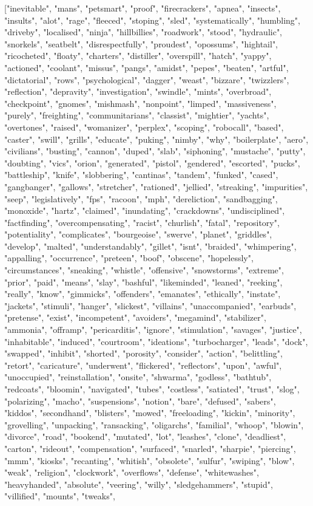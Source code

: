 ["inevitable", "mans", "petsmart", "proof", "firecrackers", "apnea", "insects", "insults", "alot", "rage", "fleeced", "stoping", "sled", "systematically", "humbling", "driveby", "localised", "ninja", "hillbillies", "roadwork", "stood", "hydraulic", "snorkels", "seatbelt", "disrespectfully", "proudest", "opossums", "hightail", "ricocheted", "floaty", "charters", "distiller", "overspill", "hatch", "yappy", "actioned", "coolant", "missus", "pangs", "amidst", "pepes", "beaten", "artful", "dictatorial", "rows", "psychological", "dagger", "weast", "bizzare", "twizzlers", "reflection", "depravity", "investigation", "swindle", "mints", "overbroad", "checkpoint", "gnomes", "mishmash", "nonpoint", "limped", "massiveness", "purely", "freighting", "communitarians", "classist", "mightier", "yachts", "overtones", "raised", "womanizer", "perplex", "scoping", "robocall", "based", "caster", "swill", "grills", "educate", "puking", "nimby", "why", "boilerplate", "aero", "civilians", "busting", "cannon", "duped", "slab", "siphoning", "mustache", "putty", "doubting", "vics", "orion", "generated", "pistol", "gendered", "escorted", "pucks", "battleship", "knife", "slobbering", "cantinas", "tandem", "funked", "cased", "gangbanger", "gallows", "stretcher", "rationed", "jellied", "streaking", "impurities", "seep", "legislatively", "fps", "racoon", "mph", "dereliction", "sandbagging", "monoxide", "hartz", "claimed", "inundating", "crackdowns", "undisciplined", "factfinding", "overcompensating", "racist", "churlish", "fatal", "repository", "potentiality", "complicates", "bourgeoise", "swerve", "planet", "griddles", "develop", "malted", "understandably", "gillet", "isnt", "braided", "whimpering", "appalling", "occurrence", "preteen", "boof", "obscene", "hopelessly", "circumstances", "sneaking", "whistle", "offensive", "snowstorms", "extreme", "prior", "paid", "means", "slay", "bashful", "likeminded", "leaned", "reeking", "really", "know", "gimmicks", "offenders", "emanates", "ethically", "instate", "jackets", "stimuli", "hanger", "slickest", "villains", "unaccompanied", "earbuds", "pretense", "exist", "incompetent", "avoiders", "megamind", "stabilizer", "ammonia", "offramp", "pericarditis", "ignore", "stimulation", "savages", "justice", "inhabitable", "induced", "courtroom", "ideations", "turbocharger", "leads", "dock", "swapped", "inhibit", "shorted", "porosity", "consider", "action", "belittling", "retort", "caricature", "underwent", "flickered", "reflectors", "upon", "awful", "unoccupied", "reinstallation", "onsite", "shwarma", "godless", "bathtub", "redcoats", "bloomin", "navigated", "tubes", "costless", "satiated", "trust", "slog", "polarizing", "macho", "suspensions", "notion", "bare", "defused", "sabers", "kiddos", "secondhand", "blisters", "mowed", "freeloading", "kickin", "minority", "grovelling", "unpacking", "ransacking", "oligarchs", "familial", "whoop", "blowin", "divorce", "road", "bookend", "mutated", "lot", "leashes", "clone", "deadliest", "carton", "rideout", "compensation", "surfaced", "snarled", "sharpie", "piercing", "mmm", "kiosks", "recanting", "whitish", "obsolete", "sulfur", "swiping", "blow", "weak", "religion", "clockwork", "overflows", "defense", "whitewashes", "heavyhanded", "absolute", "veering", "willy", "sledgehammers", "stupid", "villified", "mounts", "tweaks", 